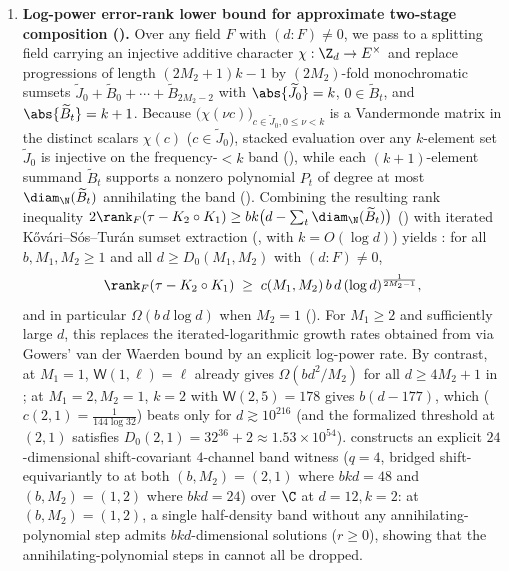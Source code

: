 \begin{enumerate}[label=\arabic*.]
\item \textbf{Log-power error-rank lower bound for approximate two-stage composition ().}
  Over any field $F$ with $(d : F) \ne 0$, we pass to a splitting field carrying an injective
  additive character $\chi : \Z_d \to E^\times$ and replace progressions of length $(2M_2 + 1)k - 1$
  by $(2M_2)$-fold monochromatic sumsets $\widetilde{J}_0 + \widetilde{B}_0 + \cdots +
  \widetilde{B}_{2M_2 - 2}$ with $\abs{\widetilde{J}_0} = k$, $0 \in \widetilde{B}_t$, and
  $\abs{\widetilde{B}_t} = k + 1$. Because $\bigl(\chi(\nu c)\bigr)_{c \in \widetilde{J}_0, 0 \le \nu < k}$
  is a Vandermonde matrix in the distinct scalars $\chi(c)$ ($c \in \widetilde{J}_0$), stacked
  evaluation over any $k$-element set $\widetilde{J}_0$ is injective on the frequency-$< k$ band
  (), while each $(k+1)$-element summand $\widetilde{B}_t$ supports a
  nonzero polynomial $P_t$ of degree at most $\diam_{\N}(\widetilde{B}_t)$ annihilating the band
  (). Combining the resulting rank inequality
  $2\rank_F(\tau - K_2 \circ K_1) \ge bk\bigl(d - \sum_t \diam_{\N}(\widetilde{B}_t)\bigr)$
  () with iterated K\H{o}v\'ari--S\'os--Tur\'an sumset extraction
  (, with $k = O(\log d)$) yields : for all $b, M_1, M_2 \ge 1$ and
  all $d \ge D_0(M_1, M_2)$ with $(d : F) \ne 0$,
  \[
    \rank_F(\tau - K_2 \circ K_1)
    \;\ge\;
    c(M_1, M_2)\,b\,d\,(\log d)^{\frac{1}{2M_2 - 1}},
  \]
  and in particular $\Omega(b\,d\log d)$ when $M_2 = 1$ (). For $M_1 \ge 2$ and
  sufficiently large $d$, this replaces the iterated-logarithmic growth rates obtained from
  \cite[Theorem~6.6]{SharedDecoders2026} via Gowers' van der Waerden bound \cite{Gowers2001} by an
  explicit log-power rate. By contrast, at $M_1 = 1$, $\mathsf{W}(1, \ell) = \ell$ already gives
  $\Omega(bd^2/M_2)$ for all $d \ge 4M_2 + 1$ in \cite[Theorem~6.6]{SharedDecoders2026}; at
  $M_1 = 2, M_2 = 1$, $k = 2$ with $\mathsf{W}(2, 5) = 178$ \cite{StevensShantaram1978} gives
  $b(d - 177)$, which  ($c(2,1) = \frac{1}{144\log 32}$) beats only for
  $d \gtrsim 10^{216}$ (and the formalized threshold at $(2,1)$ satisfies
  $D_0(2,1) = 32^{36} + 2 \approx 1.53 \times 10^{54}$).  constructs an explicit
  $24$-dimensional shift-covariant $4$-channel band witness ($q = 4$, bridged shift-equivariantly to
   at both $(b, M_2) = (2, 1)$ where $bkd = 48$ and
  $(b, M_2) = (1, 2)$ where $bkd = 24$) over $\C$ at $d = 12, k = 2$: at $(b, M_2) = (1, 2)$, a single
  half-density band without any annihilating-polynomial step admits $bkd$-dimensional solutions
  ($r \ge 0$), showing that the annihilating-polynomial steps in  cannot all be
  dropped.


\end{enumerate}
